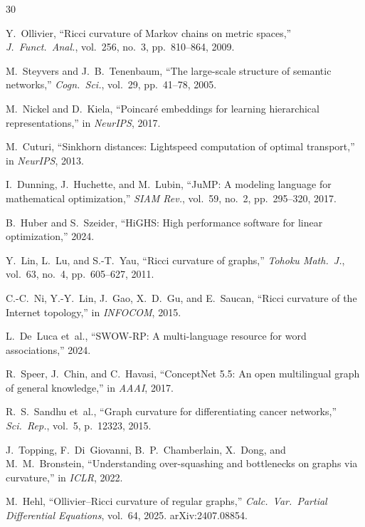 \documentclass[11pt,a4paper]{article}
\begin{document}

\begin{thebibliography}{30}

Y.~Ollivier, ``Ricci curvature of Markov chains on metric spaces,'' \emph{J.~Funct.~Anal.}, vol.~256, no.~3, pp.~810--864, 2009.

M.~Steyvers and J.~B.~Tenenbaum, ``The large-scale structure of semantic networks,'' \emph{Cogn.~Sci.}, vol.~29, pp.~41--78, 2005.

M.~Nickel and D.~Kiela, ``Poincar\'e embeddings for learning hierarchical representations,'' in \emph{NeurIPS}, 2017.

M.~Cuturi, ``Sinkhorn distances: Lightspeed computation of optimal transport,'' in \emph{NeurIPS}, 2013.

I.~Dunning, J.~Huchette, and M.~Lubin, ``JuMP: A modeling language for mathematical optimization,'' \emph{SIAM Rev.}, vol.~59, no.~2, pp.~295--320, 2017.

B.~Huber and S.~Szeider, ``HiGHS: High performance software for linear optimization,'' 2024.

Y.~Lin, L.~Lu, and S.-T.~Yau, ``Ricci curvature of graphs,'' \emph{Tohoku Math.~J.}, vol.~63, no.~4, pp.~605--627, 2011.

C.-C.~Ni, Y.-Y.~Lin, J.~Gao, X.~D.~Gu, and E.~Saucan, ``Ricci curvature of the Internet topology,'' in \emph{INFOCOM}, 2015.

L.~De~Luca et~al., ``SWOW-RP: A multi-language resource for word associations,'' 2024.

R.~Speer, J.~Chin, and C.~Havasi, ``ConceptNet 5.5: An open multilingual graph of general knowledge,'' in \emph{AAAI}, 2017.

R.~S.~Sandhu et~al., ``Graph curvature for differentiating cancer networks,'' \emph{Sci.~Rep.}, vol.~5, p.~12323, 2015.

J.~Topping, F.~Di~Giovanni, B.~P.~Chamberlain, X.~Dong, and M.~M.~Bronstein, ``Understanding over-squashing and bottlenecks on graphs via curvature,'' in \emph{ICLR}, 2022.

M.~Hehl, ``Ollivier--Ricci curvature of regular graphs,'' \emph{Calc.~Var.~Partial Differential Equations}, vol.~64, 2025. arXiv:2407.08854.


\end{thebibliography}
\end{document}

